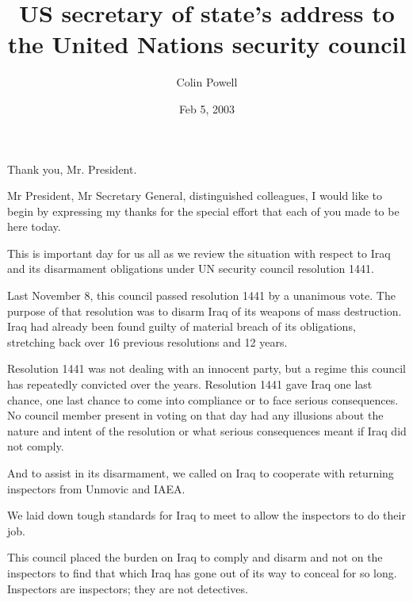 \documentclass[10pt,a4paper]{article}
\begin{document}
\title{US secretary of state's address to the United Nations security council}
\date{Feb 5, 2003}
\author{Colin Powell}


\maketitle
    
\noindent\linenumbers Thank you, Mr. President.

Mr President, Mr Secretary General, distinguished colleagues, I would like to begin by expressing my thanks for the special effort that each of you made to be here today.

This is important day for us all as we review the situation with respect to Iraq and its disarmament obligations under UN security council resolution 1441.

Last November 8, this council passed resolution 1441 by a unanimous vote. The purpose of that resolution was to disarm Iraq of its weapons of mass destruction. Iraq had already been found guilty of material breach of its obligations, stretching back over 16 previous resolutions and 12 years.

Resolution 1441 was not dealing with an innocent party, but a regime this council has repeatedly convicted over the years. Resolution 1441 gave Iraq one last chance, one last chance to come into compliance or to face serious consequences. No council member present in voting on that day had any illusions about the nature and intent of the resolution or what serious consequences meant if Iraq did not comply.

And to assist in its disarmament, we called on Iraq to cooperate with returning inspectors from Unmovic and IAEA.

We laid down tough standards for Iraq to meet to allow the inspectors to do their job.

This council placed the burden on Iraq to comply and disarm and not on the inspectors to find that which Iraq has gone out of its way to conceal for so long. Inspectors are inspectors; they are not detectives.
\end{document}
